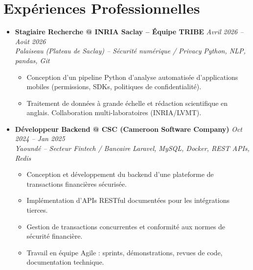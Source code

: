 \documentclass[a4paper,11pt]{article}
\begin{document}
\section{Expériences Professionnelles}
\begin{itemize}[leftmargin=*, label={-}]

\item \textbf{Stagiaire Recherche @ INRIA Saclay -- Équipe TRIBE} \hfill \textit{Avril 2026 -- Août 2026} \\
\textit{Palaiseau (Plateau de Saclay) -- Sécurité numérique / Privacy} \hfill \textit{Python, NLP, pandas, Git}
\vspace{-2pt}
    \begin{itemize}[leftmargin=0.4cm, nosep, label=\tiny$\bullet$]
        \item \small{Conception d'un pipeline Python d'analyse automatisée d'applications mobiles (permissions, SDKs, politiques de confidentialité).}
        \item \small{Traitement de données à grande échelle et rédaction scientifique en anglais. Collaboration multi-laboratoires (INRIA/LVMT).}
    \end{itemize}
\vspace{3pt}

\item \textbf{Développeur Backend @ CSC (Cameroon Software Company)} \hfill \textit{Oct 2024 -- Jan 2025} \\
\textit{Yaoundé -- Secteur Fintech / Bancaire} \hfill \textit{Laravel, MySQL, Docker, REST APIs, Redis}
\vspace{-2pt}
    \begin{itemize}[leftmargin=0.4cm, nosep, label=\tiny$\bullet$]
        \item \small{Conception et développement du backend d'une plateforme de transactions financières sécurisée.}
        \item \small{Implémentation d'APIs RESTful documentées pour les intégrations tierces.}
        \item \small{Gestion de transactions concurrentes et conformité aux normes de sécurité financière.}
        \item \small{Travail en équipe Agile : sprints, démonstrations, revues de code, documentation technique.}
    \end{itemize}
\vspace{3pt}


\end{itemize}
\end{document}

